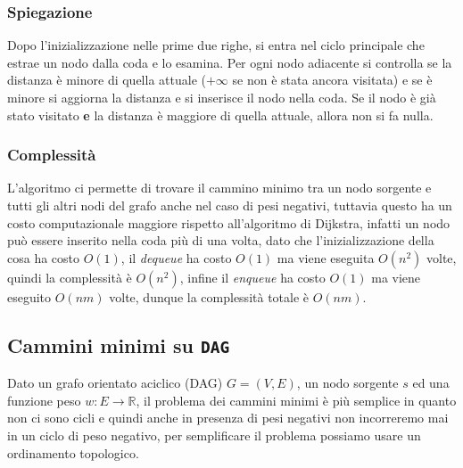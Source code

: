         \subsubsection{Spiegazione}
            Dopo l'inizializzazione nelle prime due righe, si entra nel ciclo principale che estrae un nodo dalla coda e lo esamina. Per ogni nodo adiacente si controlla se la distanza è minore di quella attuale ($+\infty$ se non è stata ancora visitata) e se è minore si aggiorna la distanza e si inserisce il nodo nella coda. Se il nodo è già stato visitato \textbf{e} la distanza è maggiore di quella attuale, allora non si fa nulla.
        \subsubsection{Complessità}
            L'algoritmo ci permette di trovare il cammino minimo tra un nodo sorgente e tutti gli altri nodi del grafo anche nel caso di pesi negativi, tuttavia questo ha un costo computazionale maggiore rispetto all'algoritmo di Dijkstra, infatti un nodo può essere inserito nella coda più di una volta, dato che l'inizializzazione della cosa ha costo $O(1)$, il \textit{dequeue} ha costo $O(1)$ ma viene eseguita $O(n^2)$ volte, quindi la complessità è $O(n^2)$, infine il \textit{enqueue} ha costo $O(1)$ ma viene eseguito $O(nm)$ volte, dunque la complessità totale è $O(nm)$.
    \subsection{Cammini minimi su \texttt{DAG}}
        Dato un grafo orientato aciclico (DAG) $G=(V,E)$, un nodo sorgente $s$ ed una funzione peso $w: E \rightarrow \mathbb{R}$, il problema dei cammini minimi è più semplice in quanto non ci sono cicli e quindi anche in presenza di pesi negativi non incorreremo mai in un ciclo di peso negativo, per semplificare il problema possiamo usare un ordinamento topologico.
